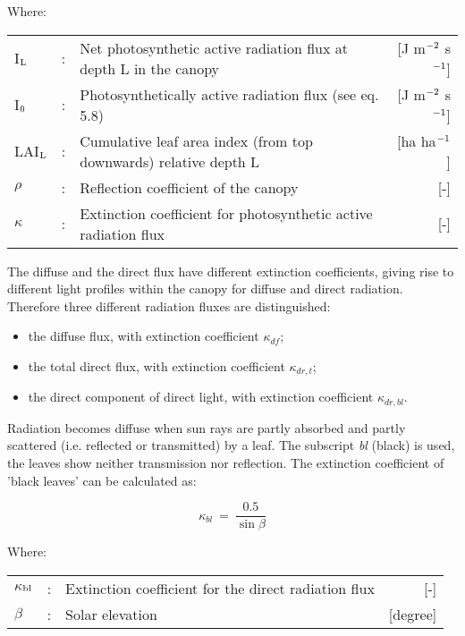 Where:\\[5pt]
\begin{tabularx}{\textwidth}{llXr}
I$_{{\rm L}}$   &:& Net photosynthetic active radiation flux at 
    depth L in the canopy    &    [J m$^{{\rm -2}}$ s$^{{\rm -1}}$]\\
I$_{{\rm 0}}$   &:& Photosynthetically active radia\-tion flux (see eq. 5.8)  & 
    [J m$^{{\rm -2}}$ s$^{{\rm -1}}$]\\
LAI$_{{\rm L}}$ &:& Cumulative leaf area index (from top downwards) 
    relative depth L & [ha ha$^{{\rm -1}}$]\\
$\rho$          &:& Reflection coefficient of the canopy   &     [-]\\
$\kappa$        &:& Extinction coefficient for photosynthetic active 
    radiation flux   &     [-]\\
\end{tabularx}

The diffuse and the direct flux have different extinction coefficients, giving rise to
different light profiles within the canopy for diffuse and direct radiation. Therefore three
different radiation fluxes are distinguished:
\begin{itemize}
\item the diffuse flux, with extinction coefficient $\kappa_{df}$;
\item the total direct flux, with extinction coefficient $\kappa_{dr,t}$;
\item the direct component of direct light, with extinction coefficient $\kappa_{dr,bl}$.
\end{itemize}

Radiation becomes diffuse when sun rays are partly absorbed and partly scattered (i.e.
reflected or transmitted) by a leaf. The subscript {\it bl} (black) is used, the leaves show
neither transmission nor reflection. The extinction coefficient of 'black leaves'
can be calculated as:

\begin{equation}
\kappa_{bl} ~=~{\frac{0.5}{\sin \beta }}
\end{equation}

Where:\\[5pt]
\begin{tabularx}{\textwidth}{llXr}
$\kappa$$_{{\rm bl}}$ &:& Extinction coefficient for the direct radiation flux   &     [-]\\
$\beta$ &:& Solar elevation    &    [degree]\\
\end{tabularx}

